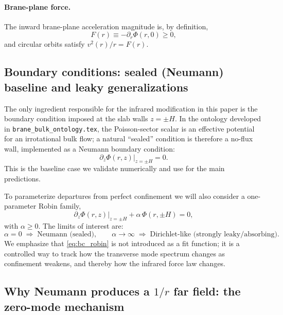 \documentclass[11pt]{article}
\begin{document}
\paragraph{Brane-plane force.}
The inward brane-plane acceleration magnitude is, by definition,
\begin{equation}
  F(r)\equiv -\partial_r \Phi(r,0)\ge 0,
  \label{eq:slab_force_def}
\end{equation}
and circular orbits satisfy $v^2(r)/r = F(r)$.

\subsection{Boundary conditions: sealed (Neumann) baseline and leaky generalizations}
\label{sec:slab_bc}

The only ingredient responsible for the infrared modification in this paper is the boundary
condition imposed at the slab walls $z=\pm H$.
In the ontology developed in \texttt{brane\_bulk\_ontology.tex}, the Poisson-sector scalar is an
effective potential for an irrotational bulk flow; a natural ``sealed'' condition is therefore a
no-flux wall, implemented as a Neumann boundary condition:
\begin{equation}
  \partial_z \Phi(r,z)\big|_{z=\pm H} = 0.
  \label{eq:bc_neumann}
\end{equation}
This is the baseline case we validate numerically and use for the main predictions.

To parameterize departures from perfect confinement we will also consider a one-parameter Robin
family,
\begin{equation}
  \partial_z \Phi(r,z)\big|_{z=\pm H} + \alpha\,\Phi(r,\pm H)=0,
  \label{eq:bc_robin}
\end{equation}
with $\alpha\ge 0$.
The limits of interest are:
\begin{equation}
  \alpha=0 \;\Rightarrow\; \text{Neumann (sealed)},\qquad
  \alpha\to\infty \;\Rightarrow\; \text{Dirichlet-like (strongly leaky/absorbing)}.
\end{equation}
We emphasize that \eqref{eq:bc_robin} is not introduced as a fit function; it is a controlled way to
track how the transverse mode spectrum changes as confinement weakens, and thereby how the infrared
force law changes.

\subsection{Why Neumann produces a $1/r$ far field: the zero-mode mechanism}
\label{sec:zero_mode_mechanism}
\end{document}
